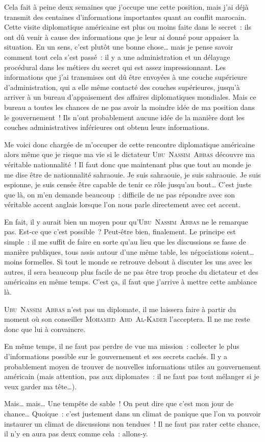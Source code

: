 {	Cela fait à peine deux semaines que j’occupe une cette position, mais j’ai déjà transmit des centaines d’informations importantes quant au conflit marocain.
	Cette visite diplomatique américaine est plus ou moins faite dans le secret~:  ils ont dû venir à cause des informations que je leur ai donné pour appaiser la situation.
	En un sens, c’est plutôt une bonne chose… mais je pense savoir comment tout cela s’est passé~:  il y a une administration et un délayage procédural dans les métiers du secret qui est assez impressionnant.
	Les informations que j’ai transmises ont dû être envoyées à une couche supérieure d’administration, qui a elle même contacté des couches supérieures, jusqu’à arriver à un bureau d’appaisement des affaires diplomatiques mondiales.
	Mais ce bureau a toutes les chances de ne pas avoir la moindre idée de ma position dans le gouvernement~!
	Ils n’ont probablement aucune idée de la manière dont les couches administratives inférieures ont obtenu leurs informations.

	Me voici donc chargée de m’occuper de cette rencontre diplomatique américaine alors même que je risque ma vie si le dictateur \textsc{Ubu~Nassim~Abbas} découvre ma véritable nationnalité~!
	Il faut donc que maintenant plus que tout au monde je me dise être de nationnalité sahraouie.
	Je suis sahraouie, je suis sahraouie.
	Je suis espionne, je suis censée être capable de tenir ce rôle jusqu’au bout…
	C’est juste que là, on m’en demande beaucoup~:  difficile de ne pas répondre avec son véritable accent anglais lorsque l’on nous parle directement avec cet accent.

	En fait, il y aurait bien un moyen pour qu’\textsc{Ubu~Nassim~Abbas} ne le remarque pas.
	Est-ce que c’est possible~?  Peut-être bien, finalement.
	Le principe est simple~:  il me suffit de faire en sorte qu’au lieu que les discussions se fasse de manière publiques, tous assis autour d’une même table, les négociations soient… moins formelles.
	Si tout le monde se retrouve debout à discuter les uns avec les autres, il sera beaucoup plus facile de ne pas être trop proche du dictateur et des américains en même temps.
	C’est ça, il faut que j’arrive à mettre cette ambiance là.

	\textsc{Ubu~Nassim~Abbas} n’est pas un diplomate, il me laissera faire à partir du moment où son conseiller \textsc{Mohamed~Abd~Al-Kader} l’acceptera.
	Il ne me reste donc que lui à convaincre.

	En même temps, il ne faut pas perdre de vue ma mission~:  collecter le plus d’informations possible sur le gouvernement et ses secrets cachés.
	Il y a probablement moyen de trouver de nouvelles informations utiles au gouvernement américain (mais attention, pas aux diplomates~:  il ne faut pas tout mélanger si je veux garder ma tête…).

	Mais… mais… Une tempête de sable~!
	On peut dire que c’est mon jour de chance…
	Quoique~:  c’est justement dans un climat de panique que l’on va pouvoir instaurer un climat de discussions non tendues~!
	Il ne faut pas rater cette chance, il n’y en aura pas deux comme cela~:  allons-y.
}

